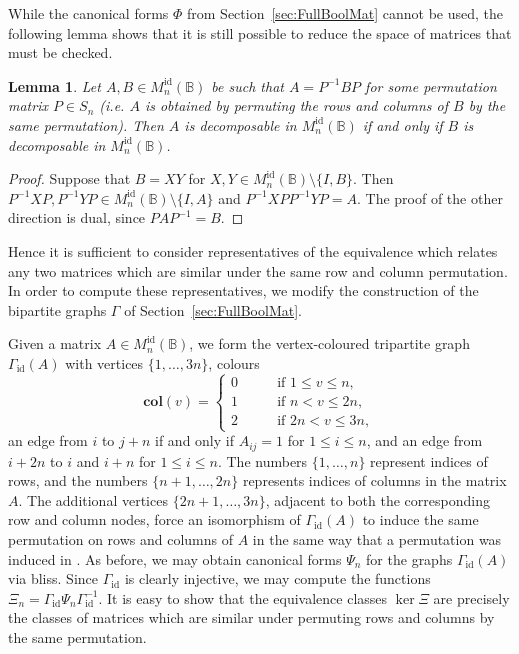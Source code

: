 \documentclass[11pt]{article}
\newtheorem{lemma}[thm]{Lemma}
\numberwithin{equation}{section}
\newcommand{\B}{\mathbb{B}}
\newcommand{\Refln}{M_n^{\text{id}}(\B)}
\begin{document}
While the canonical forms $\Phi$ from Section~\ref{sec:FullBoolMat} cannot be
used, the following lemma shows that it is still possible to reduce the space of
matrices that must be checked.

\begin{lemma}
  Let $A, B \in \Refln$ be such that $A = P^{-1} B P$ for some permutation matrix
  $P \in S_n$ (i.e. $A$ is obtained by permuting the rows and columns of $B$ by
  the same permutation). Then $A$ is decomposable in $\Refln$ if and only if $B$
  is decomposable in $\Refln$.
\end{lemma}
\begin{proof}
  Suppose that $B = XY$ for $X, Y \in \Refln\setminus \{I, B\}$. Then $P^{-1}XP,
  P^{-1}YP \in \Refln\setminus\{I, A\}$ and $P^{-1}XPP^{-1}YP = A$. The proof of
  the other direction is dual, since $PAP^{-1} = B$.
\end{proof}

Hence it is sufficient to consider representatives of the equivalence
which relates any two matrices which are similar under the same row and column
permutation. In order to compute these representatives, we modify the
construction of the bipartite graphs $\Gamma$ of Section~\ref{sec:FullBoolMat}.

Given a matrix $A \in \Refln$, we form the vertex-coloured tripartite graph
$\Gamma_\text{id}(A)$ with vertices $\{1, \ldots, 3n\}$, colours 
\[\mathbf{col}(v) = \begin{cases}
    0 \qquad &\text{if } 1 \leq v \leq n, \\
    1 \qquad &\text{if } n < v \leq 2n, \\
    2 \qquad &\text{if } 2n < v \leq 3n,
  \end{cases}
\]
an edge from $i$ to $j+n$ if and only if $A_{ij} = 1$ for $1 \leq i \leq n$,
and an edge from $i + 2n$ to $i$ and $i + n$ for $1 \leq i \leq n$. The numbers $\{1,
  \ldots, n\}$ represent indices of rows, and the numbers $\{n + 1, \ldots, 2n\}$
represents indices of columns in the matrix $A$. The additional vertices $\{2n +
  1, \ldots, 3n\}$, adjacent to both the corresponding row and column nodes,
force an isomorphism of $\Gamma_\text{id}(A)$ to induce the same permutation on rows and
columns of $A$ in the same way that a permutation was induced in
. As before, we may obtain canonical forms
$\Psi_n$ for the graphs $\Gamma_{\text{id}}(A)$ via bliss. Since
$\Gamma_\text{id}$ is clearly injective, we may compute the functions
$\Xi_n = \Gamma_\text{id}\Psi_n\Gamma_\text{id}^{-1}$. It is easy to show that
the equivalence classes $\ker\Xi$ are precisely the classes of matrices which
are similar under permuting rows and columns by the same permutation.
\end{document}
